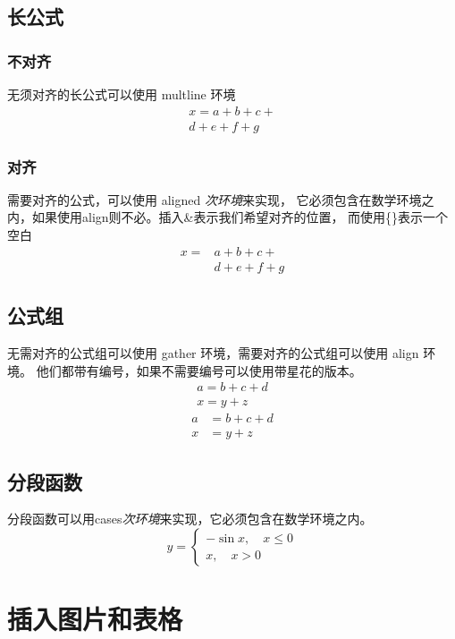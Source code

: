 \documentclass{thesis}
\begin{document}
\subsection{长公式}
\subsubsection{不对齐}
无须对齐的长公式可以使用 multline 环境
\begin{multline*}
    x = a+b+c+{} \\
    d+e+f+g
\end{multline*}
\subsubsection{对齐}
需要对齐的公式，可以使用 aligned \textit{次环境}来实现，
它必须包含在数学环境之内，如果使用align则不必。插入\&表示我们希望对齐的位置，
而使用\{\}表示一个空白
\begin{equation*} 
    \begin{aligned}
        x ={}&a+b+c+ \\
             &d+e+f+g
    \end{aligned}
\end{equation*}
\subsection{公式组}
无需对齐的公式组可以使用 gather 环境，需要对齐的公式组可以使用 align 环境。
他们都带有编号，如果不需要编号可以使用带星花的版本。
\begin{gather}
    a = b+c+d \\
    x = y+z
\end{gather}
\begin{align*}
    a &= b+c+d \\
    x &= y+z
\end{align*}
\subsection{分段函数}
分段函数可以用cases\textit{次环境}来实现，它必须包含在数学环境之内。
\begin{equation*}
    y=
    \begin{cases}
        -\sin{x},\quad x \leqslant 0 \\
        x,\quad x>0
    \end{cases} 
\end{equation*}
\section{插入图片和表格}
\end{document}
